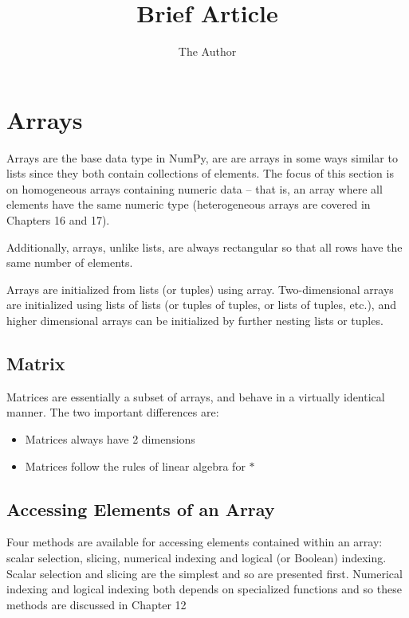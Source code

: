 \documentclass[11pt]{article} %
\title{Brief Article}
\author{The Author}
\begin{document}
\section*{Arrays}
Arrays are the base data type in NumPy, are are arrays in some ways similar to lists since they both contain
collections of elements. The focus of this section is on homogeneous arrays containing numeric data
– that is, an array where all elements have the same numeric type (heterogeneous arrays are covered in
Chapters 16 and 17). 

Additionally, arrays, unlike lists, are always rectangular so that all rows have the same
number of elements.

Arrays are initialized from lists (or tuples) using array. Two-dimensional arrays are initialized using
lists of lists (or tuples of tuples, or lists of tuples, etc.), and higher dimensional arrays can be initialized by
further nesting lists or tuples.

\subsection{Matrix}
Matrices are essentially a subset of arrays, and behave in a virtually identical manner. The two important
differences are:

\begin{itemize}
\item Matrices always have 2 dimensions
\item Matrices follow the rules of linear algebra for $\ast$
\end{itemize}

\newpage

\subsection{Accessing Elements of an Array}
Four methods are available for accessing elements contained within an array: scalar selection, slicing,
numerical indexing and logical (or Boolean) indexing. Scalar selection and slicing are the simplest and so
are presented first. Numerical indexing and logical indexing both depends on specialized functions and
so these methods are discussed in Chapter 12




\newpage
\end{document}
